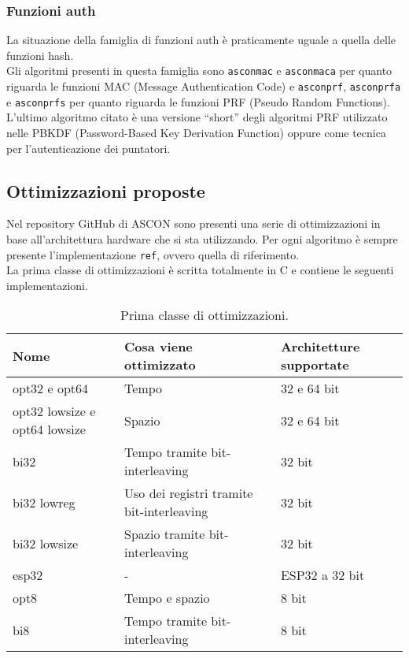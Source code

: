 \subsubsection{Funzioni auth}

La situazione della famiglia di funzioni auth è praticamente uguale a quella delle funzioni hash. \\

\noindent Gli algoritmi presenti in questa famiglia sono \texttt{asconmac} e \texttt{asconmaca} per quanto riguarda le funzioni MAC (Message Authentication Code) e \texttt{asconprf}, \texttt{asconprfa} e \texttt{asconprfs} per quanto riguarda le funzioni PRF (Pseudo Random Functions)\cite{ascon-specification-pdf}. L'ultimo algoritmo citato è una versione ``short'' degli algoritmi PRF utilizzato nelle PBKDF (Password-Based Key Derivation Function) oppure come tecnica per l'autenticazione dei puntatori.

\subsection{Ottimizzazioni proposte}

Nel repository GitHub di ASCON sono presenti una serie di ottimizzazioni in base all'architettura hardware che si sta utilizzando. Per ogni algoritmo è sempre presente l'implementazione \texttt{ref}, ovvero quella di riferimento. \\

\noindent La prima classe di ottimizzazioni è scritta totalmente in C e contiene le seguenti implementazioni\cite{github}.

\begin{table}[H]
    \centering
	\begin{tabular}{|m{}<{\centering}||m{}<{\centering}|m{}<{\centering}|}
		\hline
        \textbf{Nome} & \textbf{Cosa viene ottimizzato} & \textbf{Architetture supportate} \\
		\hline \hline
        opt32 e opt64 & Tempo & 32 e 64 bit \\
        \hline
        opt32 lowsize e opt64 lowsize & Spazio & 32 e 64 bit \\
        \hline
        bi32 & Tempo tramite bit-interleaving & 32 bit \\
        \hline
        bi32 lowreg & Uso dei registri tramite bit-interleaving & 32 bit \\
        \hline
        bi32 lowsize & Spazio tramite bit-interleaving & 32 bit \\
        \hline
        esp32 & - & ESP32 a 32 bit \\
        \hline
        opt8 & Tempo e spazio & 8 bit \\
        \hline
        bi8 & Tempo tramite bit-interleaving & 8 bit \\
        \hline
    \end{tabular}
    \caption{Prima classe di ottimizzazioni.}
\end{table}

